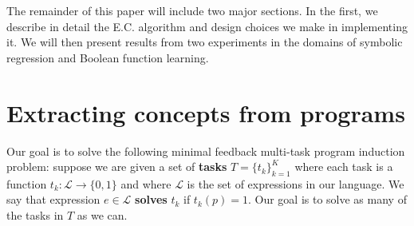 \documentclass{article}
\begin{document}
The remainder of this paper will include two major sections. In the
first, we describe in detail the E.C. algorithm and design choices we
make in implementing it. We will then present results from two
experiments in the domains of symbolic regression and Boolean
function learning.






\section{Extracting concepts from programs}

Our goal is to solve the following minimal feedback multi-task program
induction problem: suppose we are given a set of \textbf{tasks}
$T=\{t_k\}_{k=1}^K$ where each task is a function $t_k : \mathcal{L}
\rightarrow \{0, 1\}$ and where $\mathcal{L}$ is the set of
expressions in our language.  We say that expression $ e \in
\mathcal{L}$ \textbf{solves} $t_k$ if $ t_k(p) = 1$. Our goal is to
solve as many of the tasks in $T$ as we can.
\end{document}
